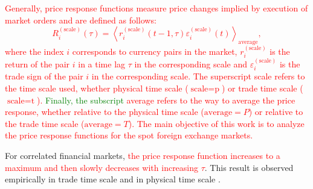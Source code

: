 \textcolor{red}{Generally, price response functions measure price changes implied by execution
of market orders and are defined as follows:
\begin{equation}\label{eq:response_general}
    R^{\left(\textrm{scale}\right)}_{i}\left(\tau\right)=\left\langle
    r^{\left(\textrm{scale}\right)}_{i}\left(t-1, \tau\right)
    \varepsilon^{\left(\textrm{scale}\right)}_{i} \left(t\right)\right\rangle
    _{\textrm{average}},
\end{equation}
where the index $i$ corresponds to currency pairs in the market,
$r^{\left(\textrm{scale}\right)}_{i}$ is the return of the pair $i$ in a time
lag $\tau$ in the corresponding scale and
$\varepsilon^{\left(\textrm{scale}\right)}_{i}$ is the trade sign of the pair
$i$ in the corresponding scale. The superscript scale refers to the time scale
used, whether physical time scale ($\textrm{scale} = \textrm{p}$) or trade time
scale ($\textrm{scale} = \textrm{t}$). \textcolor{green}{Finally, the subscript} average refers to
the way to average the price response, whether relative to the physical time
scale ($\textrm{average} = P$) or relative to the trade time scale
($\textrm{average} = T$). The main objective of this work is to analyze the
price response functions for the spot foreign exchange markets.}

For correlated financial markets, \textcolor{red}{the price response function increases to a
maximum and then slowly decreases with increasing $\tau$}. This result is observed empirically in trade
time scale and in physical time scale
\cite{my_paper_response_financial,Wang_2016_avg}.